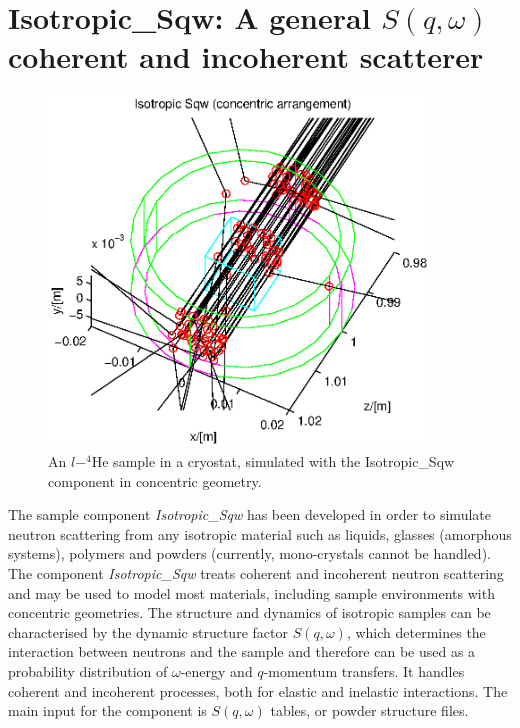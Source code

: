 \section{Isotropic\_Sqw: A general $S(q,\omega)$ coherent and incoherent scatterer}
\label{s:isotropic-sqw}


\begin{figure}
  \begin{center}
    \includegraphics[width=0.9\textwidth]{figures/sqw.eps}
  \end{center}
\caption{An $l-^4$He sample in a cryostat, simulated with the Isotropic\_Sqw component in concentric geometry.}
\label{f:isotropic-sqw}
\end{figure}

The sample component \emph{Isotropic\_Sqw} has been developed in order to simulate neutron scattering from any isotropic material such as liquids, glasses (amorphous systems), polymers and powders (currently, mono-crystals cannot be handled).
The component \emph{Isotropic\_Sqw} treats coherent and incoherent neutron scattering and may be used to model most materials, including sample environments with concentric geometries.
The structure and dynamics of isotropic samples can be characterised by the dynamic structure factor $S(q,\omega)$, which determines the interaction between neutrons and the sample and therefore can be used as a probability distribution of $\omega$-energy and $q$-momentum transfers. It handles coherent and incoherent processes, both for elastic and inelastic interactions.
The main input for the component is $S(q,\omega)$ tables, or powder structure files.

